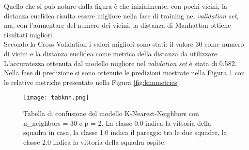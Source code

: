 Quello che si può notare dalla figura è che inizialmente, con pochi vicini, la distanza euclidea risulta essere migliore nella fase di training nel \emph{validation} \emph{set}, ma, con l'aumentare del numero dei vicini, la distanza di Manhattan ottiene risultati migliori. \\
Secondo la Cross Validation i valori migliori sono stati: il valore 30 come numero di vicini e la distanza euclidea come metrica della distanza da utilizzare. L'accuratezza ottenuta dal modello migliore nel \emph{validation} \emph{set} è stata di 0.582.\\
Nella fase di predizione si sono ottenute le predizioni mostrate nella Figura \ref{fig:knnpre} con le relative metriche presentate nella Figura \ref{fig:knnmetrics}.

\begin{figure}[h]
	\begin{center}
		\texttt{[image: tabknn.png]}
		\caption{Tabella di confusione del modello K-Nearest-Neighbors con\textsf{ n\_neighbors} = 30 e \textsf{p} = 2. La classe 0.0 indica la vittoria della squadra in casa, la classe 1.0 indica il pareggio tra le due squadre, la classe 2.0 indica la vittoria della squadra ospite.
		} 
		\label{fig:knnpre}
	\end{center}
\end{figure}

